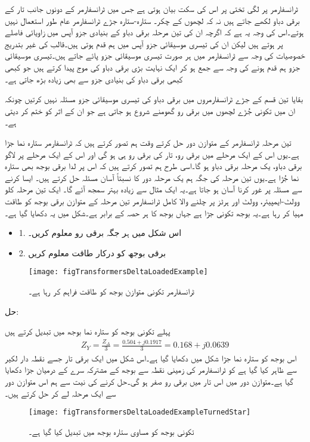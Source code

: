 	ٹرانسفارمر پر لگی تختی پر اس کی سکت بیان ہوتی ہے جس میں ٹرانسفارمر کے دونوں جانب تار کے برقی دباو لکھے جاتے ہیں نہ کہ لچھوں کے چکر۔
%
ستارہ-ستارہ جڑے ٹرانسفارمر عام طور استعمال نہیں ہوتے۔اس کی وجہ یہ ہے کہ اگرچہ ان کی تین مرحلہ برقی دباو  کے بنیادی جزو آپس میں   زاویائی فاصلے پر ہوتے ہیں لیکن ان کی تیسری موسیقائی جزو آپس میں ہم قدم ہوتی ہیں۔قالب کی غیر بتدریج خصوصیات کی وجہ سے ٹرانسفارمر میں ہر صورت تیسری موسیقائی جزو پائے جاتے ہیں۔تیسری موسیقائی جزو ہم قدم ہونے کی وجہ سے جمع ہو کر ایک نہایت بڑی برقی دباو کی موج پیدا کرتے ہیں جو کبھی کبھی برقی دباو کی بنیادی جزو سے بھی زیادہ بڑھ جاتی ہے۔

بقایا تین قسم کے جڑے ٹرانسفارمروں میں برقی دباو کی تیسری موسیقائی جزو مسئلہ نہیں کرتیں چونکہ ان میں تکونی جُڑے لچھوں میں برقی رو گھومنے شروع ہو جاتی ہے جو ان کے اثر کو ختم کر دیتی ہے۔

تین مرحلہ ٹرانسفارمر کے متوازن دور حل کرتے وقت ہم تصور کرتے ہیں کہ ٹرانسفارمر ستارہ نما جڑا  ہے۔یوں اس کے ایک مرحلے میں برقی رو، تار  کی برقی رو ہی ہو گی اور اس کے ایک مرحلے پر لاگو برقی دباو، یک مرحلہ برقی دباو  ہو گا۔اسی طرح ہم تصور کرتے ہیں کہ اس پر لدا برقی بوجھ بھی ستارہ نما جُڑا ہے۔یوں تین مرحلہ کی جگہ ہم یک مرحلہ دور کا نسبتاً آسان مسئلہ حل کرتے ہیں۔ ایسا کرنے سے مسئلہ پر غور کرنا آسان ہو جاتا ہے۔یہ ایک مثال سے زیادہ بہتر سمجھ آئے گا۔
%
ایک تین مرحلہ     کلو وولٹ-ایمپیئر،    وولٹ اور  ہرٹز پر چلنے والا کامل ٹرانسفارمر تین مرحلہ کے متوازن برقی بوجھ کو طاقت مہیا کر رہا ہے۔یہ بوجھ تکونی جڑا ہے جہاں بوجھ کا ہر حصہ  کے برابر ہے۔شکل   میں یہ دکھایا گیا ہے۔
\begin{itemize}
\item
1. اس شکل میں ہر جگہ برقی رو معلوم کریں۔
\item
2. برقی بوجھ کو درکار طاقت معلوم کریں
\end{itemize}

\begin{figure}
\centering
\texttt{[image: figTransformersDeltaLoadedExample]}
\caption{ٹرانسفارمر تکونی متوازن بوجھ کو طاقت فراہم کر رہا ہے۔}
\label{شکل_ٹرانسفارمر_تکونی_بار_کی_مثال}
\end{figure}
حل:

پہلے تکونی بوجھ کو ستارہ نما بوجھ میں تبدیل کرتے ہیں
\begin{align*}
Z_Y= \frac{Z_\Delta}{3}=\frac{0.504+j0.1917}{3}=0.168+j0.0639
\end{align*}
اس بوجھ کو ستارہ نما جڑا شکل  میں دکھایا گیا ہے۔اس شکل میں ایک برقی تار جسے نقطہ دار لکیر سے ظاہر کیا گیا ہے کو ٹرانسفارمر کی زمینی نقطہ سے بوجھ کے مشترکہ سرے کے درمیان جڑا دکھایا گیا ہے۔متوازن دور میں اس تار میں برقی رو صفر ہو گی۔حل کرنے کی نیت سے ہم اس متوازن دور سے ایک مرحلہ لے کر حل کرتے ہیں۔
\begin{figure}
\centering
\texttt{[image: figTransformersDeltaLoadedExampleTurnedStar]}
\caption{تکونی بوجھ کو مساوی ستارہ بوجھ میں تبدیل کیا گیا ہے۔}
\label{شکل_ٹرانسفارمر_تکونی_بار_کو_ستارہ_تبادلہ}
\end{figure}

